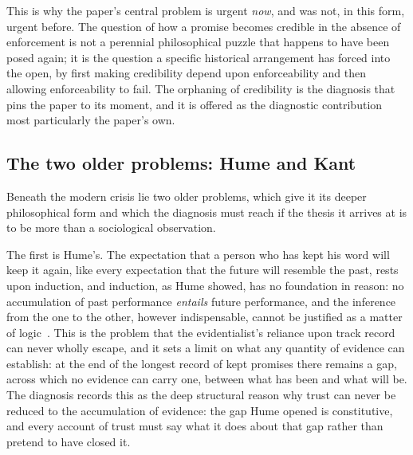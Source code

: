 This is why the paper's central problem is urgent \emph{now}, and was not, in this form, urgent before. The question of how a promise becomes credible in the absence of enforcement is not a perennial philosophical puzzle that happens to have been posed again; it is the question a specific historical arrangement has forced into the open, by first making credibility depend upon enforceability and then allowing enforceability to fail. The orphaning of credibility is the diagnosis that pins the paper to its moment, and it is offered as the diagnostic contribution most particularly the paper's own.

\subsection{The two older problems: Hume and Kant}
\label{p13:sub:diag-humekant}

Beneath the modern crisis lie two older problems, which give it its deeper philosophical form and which the diagnosis must reach if the thesis it arrives at is to be more than a sociological observation.

The first is Hume's. The expectation that a person who has kept his word will keep it again, like every expectation that the future will resemble the past, rests upon induction, and induction, as Hume showed, has no foundation in reason: no accumulation of past performance \emph{entails} future performance, and the inference from the one to the other, however indispensable, cannot be justified as a matter of logic~\parencite{hume2000}. This is the problem that the evidentialist's reliance upon track record can never wholly escape, and it sets a limit on what any quantity of evidence can establish: at the end of the longest record of kept promises there remains a gap, across which no evidence can carry one, between what has been and what will be. The diagnosis records this as the deep structural reason why trust can never be reduced to the accumulation of evidence: the gap Hume opened is constitutive, and every account of trust must say what it does about that gap rather than pretend to have closed it.

